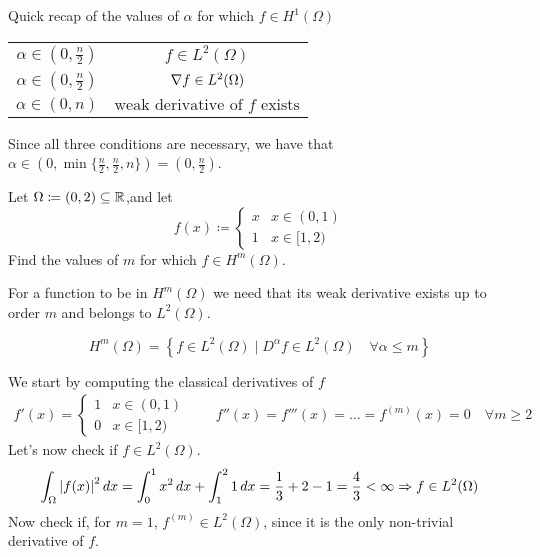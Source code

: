 Quick recap of the values of \(\alpha\) for which \(f \in H^1(\Omega)\) %
\begin{table}[h]
    \centering
        \begin{tabular}{c|c}
            \(\alpha \in (0, \frac{n}{2})\) & \(f \in L^2(\Omega)\) \\
            \(\alpha \in (0, \frac{n}{2})\) & \(\nabla f \in L^2(\Omega)\) \\
            \(\alpha \in (0, n)\) & \(\text{weak derivative of } f \text{ exists}\)
        \end{tabular}
\end{table}

Since all three conditions are necessary, we have that \(\alpha \in (0, \min\{\frac{n}{2}, \frac{n}{2}, n\}) = (0, \frac{n}{2})\).

\newpage
\begin{exercise}
Let \(\Omega \coloneqq (0,2) \subseteq \mathbb{R}\),and let 
\[
    f(x) \coloneqq \begin{cases}
        x & x \in (0, 1) \\
        1 & x \in [1, 2)
    \end{cases}
\]
Find the values of \(m\) for which \(f \in H^m(\Omega)\).
\end{exercise}
For a function to be in \(H^m(\Omega)\) we need that its weak derivative exists up to order \(m\) and belongs to \(L^2(\Omega)\). 
\begin{remark}
    \[
        H^m(\Omega) = \left\{ f \in L^2(\Omega) \mid D^\alpha f \in L^2(\Omega) \quad \forall \alpha \leq m \right\}
    \]
\end{remark}
We start by computing the classical derivatives of \(f\)
\[
    \begin{split}
        f'(x) = \begin{cases}
            1 & x \in (0, 1) \\
            0 & x \in [1, 2)
        \end{cases} \qquad f''(x) = f'''(x)  = \ldots = f^{(m)}(x) = 0 \quad \forall m \geq 2
    \end{split}
\]
Let's now check if \(f \in L^2(\Omega)\).
\[
    \begin{split}
        \int_\Omega \abs{f(x)}^2 \, dx = \int_0^1 x^2 \, dx + \int_1^2 1 \, dx = \frac{1}{3} + 2 - 1 = \frac{4}{3} < \infty \Rightarrow f \in L^2(\Omega)
    \end{split}
\]
Now check if, for \(m = 1\), \(f^{(m)} \in L^2(\Omega)\), since it is the only non-trivial derivative of \(f\).
